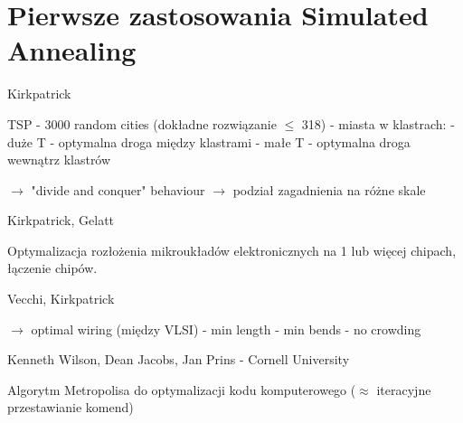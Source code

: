 \section{Pierwsze zastosowania Simulated Annealing}

Kirkpatrick

TSP - 3000 random cities (dokładne rozwiązanie $\leq$ 318) - miasta w klastrach:
- duże T - optymalna droga między klastrami
- małe T - optymalna droga wewnątrz klastrów

$\rightarrow$ "divide and conquer" behaviour $\rightarrow$ podział zagadnienia na różne skale

Kirkpatrick, Gelatt

Optymalizacja rozłożenia mikroukładów elektronicznych na 1 lub więcej chipach, łączenie chipów.

Vecchi, Kirkpatrick

$\rightarrow$ optimal wiring (między VLSI)
- min length
- min bends
- no crowding

Kenneth Wilson, Dean Jacobs, Jan Prins - Cornell University

Algorytm Metropolisa do optymalizacji kodu komputerowego ($\approx$ iteracyjne przestawianie komend)


